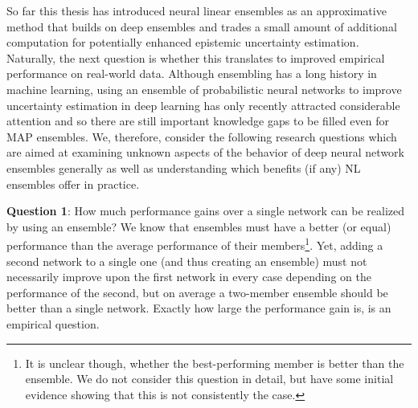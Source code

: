 \documentclass[../thesis.tex]{subfiles}
\begin{document}
So far this thesis has introduced neural linear ensembles as an approximative method that builds on deep ensembles and trades a small amount of additional computation for potentially enhanced epistemic uncertainty estimation.
Naturally, the next question is whether this translates to improved empirical performance on real-world data. Although ensembling has a long history in machine learning, using an ensemble of probabilistic neural networks to improve uncertainty estimation in deep learning has only recently attracted considerable attention and so there are still important knowledge gaps to be filled even for MAP ensembles. We, therefore, consider the following research questions which are aimed at examining unknown aspects of the behavior of deep neural network ensembles generally as well as understanding which benefits (if any) NL ensembles offer in practice. 
\medskip

\noindent \textbf{Question 1}: How much performance gains over a single network can be realized by using an ensemble? We know that ensembles must have a better (or equal) performance than the average performance of their members\footnote{It is unclear though, whether the best-performing member is better than the ensemble. We do not consider this question in detail, but have some initial evidence showing that this is not consistently the case.}. Yet, adding a second network to a single one (and thus creating an ensemble) must not necessarily improve upon the first network in every case depending on the performance of the second, but on average a two-member ensemble should be better than a single network. Exactly how large the performance gain is, is an empirical question. 


\medskip
\end{document}
